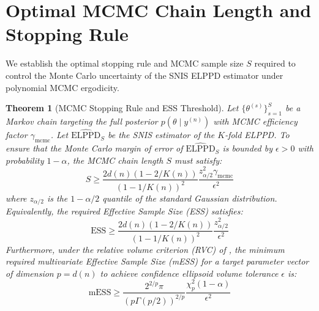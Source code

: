 \documentclass[12pt]{article}
\newtheorem{theorem}{Theorem}
\begin{document}
\section{Optimal MCMC Chain Length and Stopping Rule}
We establish the optimal stopping rule and MCMC sample size $S$ required to control the Monte Carlo uncertainty of the SNIS ELPPD estimator under polynomial MCMC ergodicity.

\begin{theorem}[MCMC Stopping Rule and ESS Threshold]\label{thm:stopping_rule}
Let $\{\theta^{(s)}\}_{s=1}^S$ be a Markov chain targeting the full posterior $p(\theta \mid y^{(n)})$ with MCMC efficiency factor $\gamma_{\mathrm{mcmc}}$. Let $\widehat{\text{ELPPD}}_S$ be the SNIS estimator of the $K$-fold ELPPD. To ensure that the Monte Carlo margin of error of $\widehat{\text{ELPPD}}_S$ is bounded by $\epsilon > 0$ with probability $1 - \alpha$, the MCMC chain length $S$ must satisfy:
\begin{equation}
S \geq \frac{2 d(n) (1 - 2/K(n))}{(1 - 1/K(n))^2} \frac{z_{\alpha/2}^2 \gamma_{\mathrm{mcmc}}}{\epsilon^2}
\end{equation}
where $z_{\alpha/2}$ is the $1 - \alpha/2$ quantile of the standard Gaussian distribution. Equivalently, the required Effective Sample Size (ESS) satisfies:
\begin{equation}
\text{ESS} \geq \frac{2 d(n) (1 - 2/K(n))}{(1 - 1/K(n))^2} \frac{z_{\alpha/2}^2}{\epsilon^2}
\end{equation}
Furthermore, under the relative volume criterion (RVC) of \cite{jones2006fixed, vats2019multivariate}, the minimum required multivariate Effective Sample Size (mESS) for a target parameter vector of dimension $p = d(n)$ to achieve confidence ellipsoid volume tolerance $\epsilon$ is:
\begin{equation}
\text{mESS} \geq \frac{2^{2/p} \pi}{(p \Gamma(p/2))^{2/p}} \frac{\chi^2_p(1-\alpha)}{\epsilon^2}
\end{equation}
\end{theorem}
\end{document}
